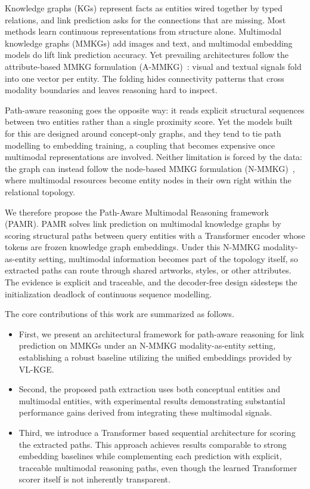 \documentclass[runningheads]{llncs}
\begin{document}
Knowledge graphs (KGs) represent facts as entities wired together by typed relations, and link prediction asks for the connections that are missing. Most methods learn continuous representations from structure alone. Multimodal knowledge graphs (MMKGs) add images and text, and multimodal embedding models do lift link prediction accuracy. Yet prevailing architectures follow the attribute-based MMKG formulation (A-MMKG)~\cite{zhu2024multimodal}: visual and textual signals fold into one vector per entity. The folding hides connectivity patterns that cross modality boundaries and leaves reasoning hard to inspect.

Path-aware reasoning goes the opposite way: it reads explicit structural sequences between two entities rather than a single proximity score. Yet the models built for this are designed around concept-only graphs, and they tend to tie path modelling to embedding training, a coupling that becomes expensive once multimodal representations are involved. Neither limitation is forced by the data: the graph can instead follow the node-based MMKG formulation (N-MMKG)~\cite{zhu2024multimodal,liang2024survey}, where multimodal resources become entity nodes in their own right within the relational topology.

We therefore propose the Path-Aware Multimodal Reasoning framework (PAMR). PAMR solves link prediction on multimodal knowledge graphs by scoring structural paths between query entities with a Transformer encoder whose tokens are frozen knowledge graph embeddings. Under this N-MMKG modality-as-entity setting, multimodal information becomes part of the topology itself, so extracted paths can route through shared artworks, styles, or other attributes. The evidence is explicit and traceable, and the decoder-free design sidesteps the initialization deadlock of continuous sequence modelling.

The core contributions of this work are summarized as follows.

\begin{itemize}
  \item First, we present an architectural framework for path-aware reasoning for link prediction on MMKGs under an N-MMKG modality-as-entity setting, establishing a robust baseline utilizing the unified embeddings provided by VL-KGE.
  \item Second, the proposed path extraction uses both conceptual entities and multimodal entities, with experimental results demonstrating substantial performance gains derived from integrating these multimodal signals.
  \item Third, we introduce a Transformer based sequential architecture for scoring the extracted paths. This approach achieves results comparable to strong embedding baselines while complementing each prediction with explicit, traceable multimodal reasoning paths, even though the learned Transformer scorer itself is not inherently transparent.
\end{itemize}
\end{document}
